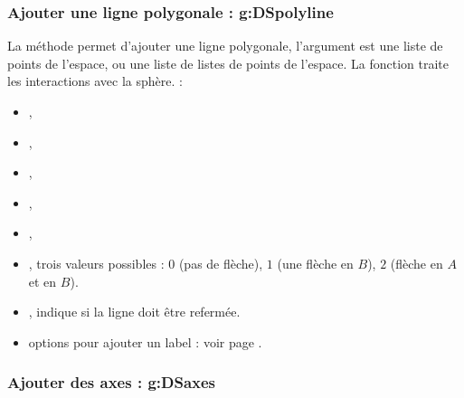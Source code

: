 \subsubsection{ Ajouter une ligne polygonale : g:DSpolyline}

La méthode  permet d'ajouter une ligne polygonale, l'argument  est une liste de points de l'espace, ou une liste de listes de points de l'espace. La fonction traite les interactions avec la sphère. \writeoptions :
    \begin{itemize}
        \item {}, 
        \item {},
        \item {},
        \item {},
        \item {},
        \item {}, trois valeurs possibles : $0$ (pas de flèche), $1$ (une flèche en $B$), $2$ (flèche en $A$ et en $B$).
        \item {}, indique si la ligne doit être refermée.
        \item options pour ajouter un label : voir page \pageref{addlabel}.
    \end{itemize} 
    
\subsubsection{Ajouter des axes : g:DSaxes}


